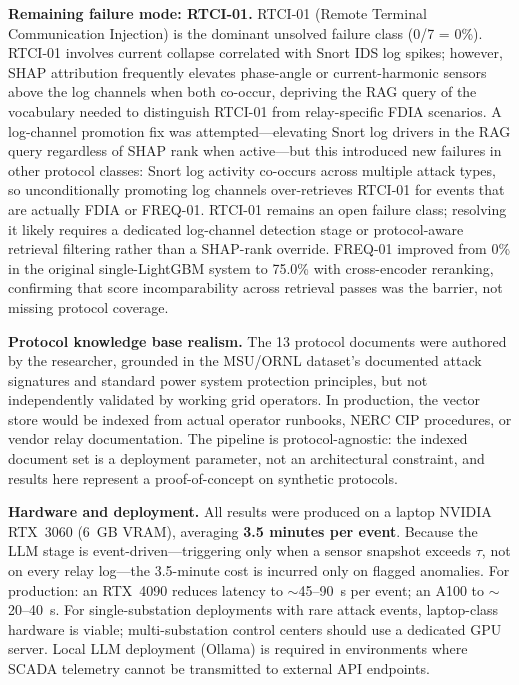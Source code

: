 \documentclass[twocolumn, 10pt, letterpaper]{article}
\begin{document}
\textbf{Remaining failure mode: RTCI-01.}
RTCI-01 (Remote Terminal Communication Injection) is the dominant unsolved failure
class (0/7 = 0\%).
RTCI-01 involves current collapse correlated with Snort IDS log spikes; however,
SHAP attribution frequently elevates phase-angle or current-harmonic sensors above
the log channels when both co-occur, depriving the RAG query of the vocabulary
needed to distinguish RTCI-01 from relay-specific FDIA scenarios.
A log-channel promotion fix was attempted---elevating Snort log drivers in
the RAG query regardless of SHAP rank when active---but this introduced new
failures in other protocol classes: Snort log activity co-occurs across multiple
attack types, so unconditionally promoting log channels over-retrieves RTCI-01
for events that are actually FDIA or FREQ-01.
RTCI-01 remains an open failure class; resolving it likely requires a dedicated
log-channel detection stage or protocol-aware retrieval filtering rather than a
SHAP-rank override.
FREQ-01 improved from 0\% in the original single-LightGBM system to 75.0\% with
cross-encoder reranking, confirming that score incomparability across retrieval
passes was the barrier, not missing protocol coverage.

\textbf{Protocol knowledge base realism.}
The 13 protocol documents were authored by the researcher, grounded in the
MSU/ORNL dataset's documented attack signatures and standard power system
protection principles, but not independently validated by working grid operators.
In production, the vector store would be indexed from actual operator runbooks,
NERC CIP procedures, or vendor relay documentation.
The pipeline is protocol-agnostic: the indexed document set is a deployment
parameter, not an architectural constraint, and results here represent a
proof-of-concept on synthetic protocols.

\textbf{Hardware and deployment.}
All results were produced on a laptop NVIDIA RTX~3060 (6~GB VRAM), averaging
\textbf{3.5 minutes per event}.
Because the LLM stage is event-driven---triggering only when a sensor snapshot
exceeds $\tau$, not on every relay log---the 3.5-minute cost is incurred only on
flagged anomalies.
For production: an RTX~4090 reduces latency to $\sim$45--90~s per event;
an A100 to $\sim$20--40~s.
For single-substation deployments with rare attack events, laptop-class hardware
is viable; multi-substation control centers should use a dedicated GPU server.
Local LLM deployment (Ollama) is required in environments where SCADA telemetry
cannot be transmitted to external API endpoints.
\end{document}
